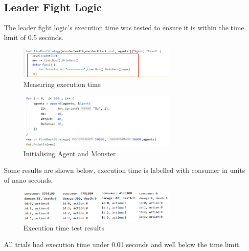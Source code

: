 \subsection{Leader Fight Logic}
The leader fight logic's execution time was tested to ensure it is within the time limit of 0.5 seconds.

\begin{figure}[htb]
    \centering
    \includegraphics[width=0.7\textwidth]{008_team_5_agent_design/images/10.png}
    \caption{Measuring execution time}
    \label{testingexecutiontime}
\end{figure}

\begin{figure}[!ht]
    \centering
    \includegraphics[width=0.7\textwidth]{008_team_5_agent_design/images/11.png}
    \caption{Initialising Agent and Monster}
    \label{initialisingagentandmonster}
\end{figure}

Some results are shown below, execution time is labelled with consumer in units of nano seconds.

\begin{figure}[!ht]
    \centering
    \includegraphics[width=0.7\textwidth]{008_team_5_agent_design/images/12.png}
    \caption{Execution time test results}
    \label{executiontimetestresults}
\end{figure}

All trials had execution time under 0.01 seconds and well below the time limit.
